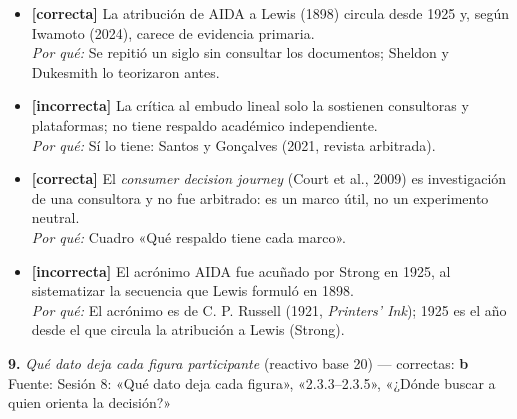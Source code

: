 \documentclass[10pt,letterpaper]{article}
\begin{document}
\begin{itemize}[leftmargin=1.2em,itemsep=0pt,topsep=1pt,parsep=0pt]
\item[\textbf{a)}] {\footnotesize \textbf{[correcta]} La atribución de AIDA a Lewis (1898) circula desde 1925 y, según Iwamoto (2024), carece de evidencia primaria.\\ \textit{Por qué:} Se repitió un siglo sin consultar los documentos; Sheldon y Dukesmith lo teorizaron antes.}
\item[\textbf{b)}] {\footnotesize \textbf{[incorrecta]} La crítica al embudo lineal solo la sostienen consultoras y plataformas; no tiene respaldo académico independiente.\\ \textit{Por qué:} Sí lo tiene: Santos y Gonçalves (2021, revista arbitrada).}
\item[\textbf{c)}] {\footnotesize \textbf{[correcta]} El \textit{consumer decision journey} (Court et al., 2009) es investigación de una consultora y no fue arbitrado: es un marco útil, no un experimento neutral.\\ \textit{Por qué:} Cuadro «Qué respaldo tiene cada marco».}
\item[\textbf{d)}] {\footnotesize \textbf{[incorrecta]} El acrónimo AIDA fue acuñado por Strong en 1925, al sistematizar la secuencia que Lewis formuló en 1898.\\ \textit{Por qué:} El acrónimo es de C. P. Russell (1921, \textit{Printers' Ink}); 1925 es el año desde el que circula la atribución a Lewis (Strong).}
\end{itemize}
\vspace{3pt}\noindent\textbf{9.} \textit{Qué dato deja cada figura participante} (reactivo base 20) — correctas: \textbf{b}\\[-1pt]
{\scriptsize Fuente: Sesión 8: «Qué dato deja cada figura», «2.3.3--2.3.5», «¿Dónde buscar a quien orienta la decisión?»}
\end{document}
